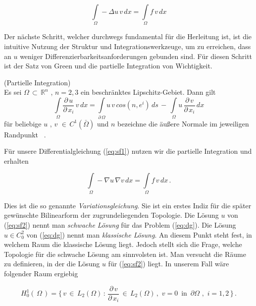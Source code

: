 \begin{equation}
\label{eq:sf1}
\int\limits_{\Omega} - \Delta u \, v  \, dx = \int\limits_{\Omega} f \, v  \, dx
\end{equation}

Der nächste Schritt, welcher durchwegs fundamental für die Herleitung ist, ist die intuitive Nutzung der Struktur und Integrationswerkzeuge, um zu erreichen, dass an $u$ weniger Differenzierbarkeitsanforderungen gebunden sind. Für diesen Schritt ist der Satz von Green und die partielle Integration von Wichtigkeit.

\begin{Lemma} (Partielle Integration) \label{lemma:part} \\
Es sei $\Omega \, \subset \, \mathbb{R}^{n}$ , $n=2,3$ ein beschränktes Lipschitz-Gebiet. Dann gilt
\begin{equation*}
\int\limits_{\Omega} \dfrac{\partial \, u}{\partial \, x_i} \, v \, dx = \int\limits_{\partial \, \Omega} u \, v \, cos(n,e^i) \, ds \, - \, \int\limits_{\Omega} u \, \dfrac{\partial \, v}{\partial \, x_i} \, dx
\end{equation*}
für beliebige $u$ , $v$ $\in \, C^1(\bar{\Omega})$ und $n$ bezeichne die äußere Normale im jeweiligen Randpunkt ~\cite[139]{Numerik}.
\end{Lemma}

Für unsere Differentialgleichung (\ref{eq:sf1}) nutzen wir die partielle Integration und erhalten

\begin{equation} \label{eq:sf2}
\int\limits_{\Omega} - \nabla u \, \nabla v \, dx = \int\limits_{\Omega} f \, v \, dx \, .
\end{equation}
  
Dies ist die so genannte \textit{Variationsgleichung}. Sie ist ein erstes Indiz für die später gewünschte Bilinearform der zugrundeliegenden Topologie. 
Die Lösung $u$ von (\ref{eq:sf2}) nennt man \textit{schwache Lösung} für das Problem (\ref{eq:dg}).
Die Lösung $u \in C_{0}^{2}$ von (\ref{eq:dg}) nennt man \textit{klassische Lösung}. An diesem Punkt steht fest, in welchem Raum die klassische Lösung liegt. Jedoch stellt sich die Frage, welche Topologie für die schwache Lösung am sinnvolsten ist.
Man versucht die Räume zu definieren, in der die Lösung $u$ für (\ref{eq:sf2}) liegt. In unserem Fall wäre folgender Raum ergiebig

\begin{equation*}
	H_{0}^{1}(\, \Omega\, ) = \{ \, v \, \in \, L_{2}(\Omega) \, : \, \dfrac{\partial \, v}{\partial \, x_{i}}  \, \in \, L_{2}(\Omega) \, , \, \, v=0 \, \text{ in } \, \partial \Omega \text{ , } \,  i=1,2 \, \} \, .
\end{equation*}

